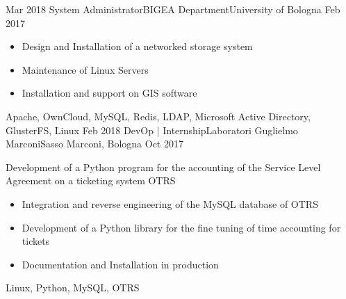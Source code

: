 %
%
%

\begin{experiences}
  \experience
    {Mar 2018}   {System Administrator}{BIGEA Department}{University of Bologna}
    {Feb 2017} {
                      \begin{itemize}
                        \item Design and Installation of a networked storage system
                        \item Maintenance of Linux Servers
                        \item Installation and support on GIS software
                      \end{itemize}
                    }
                    {Apache, OwnCloud, MySQL, Redis, LDAP, Microsoft Active Directory, GlusterFS, Linux}
  \experience
    {Feb 2018} {DevOp | Internship}{Laboratori Guglielmo Marconi}{Sasso Marconi, Bologna}
    {Oct 2017}    {
                      Development of a Python program for the accounting of the Service Level Agreement on a ticketing system OTRS
                      \begin{itemize}
                        \item Integration and reverse engineering of the MySQL database of OTRS
                        \item Development of a Python library for the fine tuning of time accounting for tickets
                        \item Documentation and Installation in production
                      \end{itemize}
                    }
                    {Linux, Python, MySQL, OTRS}
  \emptySeparator
\end{experiences}
